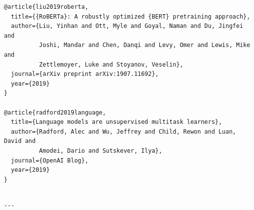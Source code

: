 \begin{lstlisting}
@article{liu2019roberta,
  title={{RoBERTa}: A robustly optimized {BERT} pretraining approach},
  author={Liu, Yinhan and Ott, Myle and Goyal, Naman and Du, Jingfei and 
          Joshi, Mandar and Chen, Danqi and Levy, Omer and Lewis, Mike and 
          Zettlemoyer, Luke and Stoyanov, Veselin},
  journal={arXiv preprint arXiv:1907.11692},
  year={2019}
}

@article{radford2019language,
  title={Language models are unsupervised multitask learners},
  author={Radford, Alec and Wu, Jeffrey and Child, Rewon and Luan, David and 
          Amodei, Dario and Sutskever, Ilya},
  journal={OpenAI Blog},
  year={2019}
}
\end{lstlisting}
\begin{lstlisting}

---
\end{lstlisting}